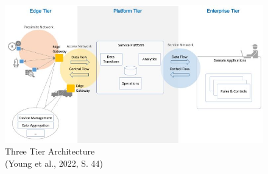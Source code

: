 \begin{figure}[H]
	\includegraphics[width=\linewidth]{pic/three-tier-architecture.jpg}
	\caption{Three Tier Architecture \\ (Young et al., 2022, S. 44)}
	\label{fig:Three-Tier-Architecture}
\end{figure}
